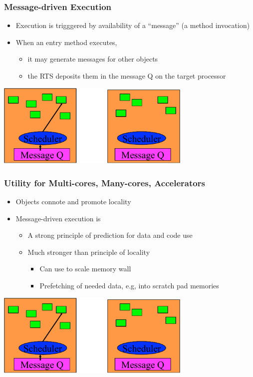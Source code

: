 \begin{frame}[t]
\frametitle{Message-driven Execution}
  \begin{itemize}
    \item Execution is trigggered by availability of a ``message” (a method invocation)
    \item When an entry method executes, 
    \begin{itemize}
      \item it may generate messages for other objects
      \item the RTS deposits them in the message Q on the target processor
    \end{itemize}
  \end{itemize}
  \begin{center} \includegraphics[width=0.7\textwidth]{figures/scheduler} \end{center}
\end{frame}

\begin{frame}[t]
\frametitle{Utility for Multi-cores, Many-cores, Accelerators}
  \begin{itemize}
    \item Objects connote and promote locality
    \item Message-driven execution is
    \begin{itemize}
      \item A strong principle of prediction for data and code use
      \item Much stronger than principle of locality
      \begin{itemize}
        \item Can use to scale memory wall
        \item Prefetching of needed data, e.g, into scratch pad memories
      \end{itemize}
    \end{itemize}
  \end{itemize}
  \begin{center} \includegraphics[width=0.7\textwidth]{figures/scheduler} \end{center}
\end{frame}

